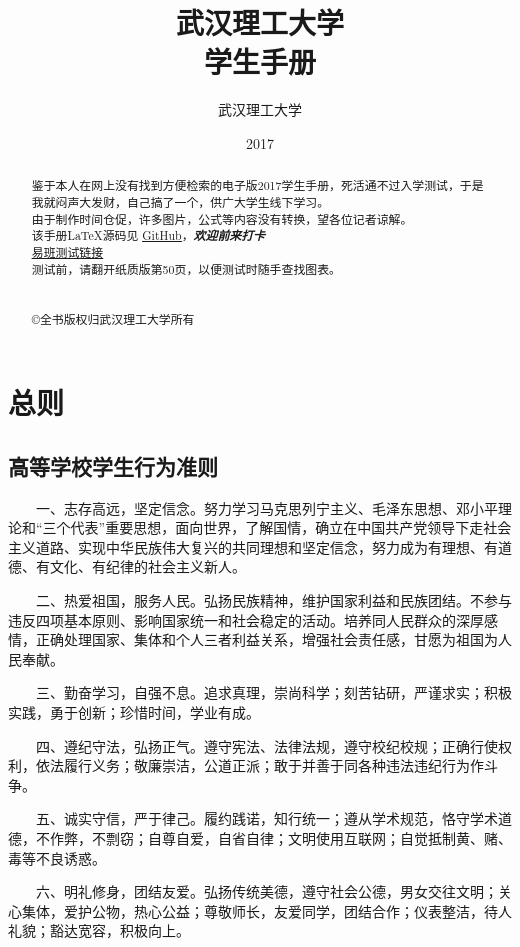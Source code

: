 \documentclass[UTF8,12pt,a4paper]{report}
\title{\textbf{武汉理工大学} \\ \textbf{学生手册}}
\author{武汉理工大学}
\date{2017}
\begin{document}
	
	\maketitle
\begin{abstract}
鉴于本人在网上没有找到方便检索的电子版2017学生手册，死活通不过入学测试，于是我就闷声大发财，自己搞了一个，供广大学生线下学习。\\
由于制作时间仓促，许多图片，公式等内容没有转换，望各位记者谅解。\\
该手册\LaTeX 源码见 \href{https://github.com/Markhng/WHUT-Student-Handbook/}{\underline{GitHub}}，\textbf{\textit{欢迎前来打卡}}\\
\href{http://www.yiban.cn/t/student/showtk/}{\underline{易班测试链接}}\\
测试前，请翻开纸质版第50页，以便测试时随手查找图表。\\\\\\
\copyright 全书版权归武汉理工大学所有
\end{abstract}
	\tableofcontents
\part{总则}
\chapter{高等学校学生行为准则}
　　一、志存高远，坚定信念。努力学习马克思列宁主义、毛泽东思想、邓小平理论和“三个代表”重要思想，面向世界，了解国情，确立在中国共产党领导下走社会主义道路、实现中华民族伟大复兴的共同理想和坚定信念，努力成为有理想、有道德、有文化、有纪律的社会主义新人。

　　二、热爱祖国，服务人民。弘扬民族精神，维护国家利益和民族团结。不参与违反四项基本原则、影响国家统一和社会稳定的活动。培养同人民群众的深厚感情，正确处理国家、集体和个人三者利益关系，增强社会责任感，甘愿为祖国为人民奉献。

　　三、勤奋学习，自强不息。追求真理，崇尚科学；刻苦钻研，严谨求实；积极实践，勇于创新；珍惜时间，学业有成。

　　四、遵纪守法，弘扬正气。遵守宪法、法律法规，遵守校纪校规；正确行使权利，依法履行义务；敬廉崇洁，公道正派；敢于并善于同各种违法违纪行为作斗争。

　　五、诚实守信，严于律己。履约践诺，知行统一；遵从学术规范，恪守学术道德，不作弊，不剽窃；自尊自爱，自省自律；文明使用互联网；自觉抵制黄、赌、毒等不良诱惑。

　　六、明礼修身，团结友爱。弘扬传统美德，遵守社会公德，男女交往文明；关心集体，爱护公物，热心公益；尊敬师长，友爱同学，团结合作；仪表整洁，待人礼貌；豁达宽容，积极向上。
\end{document}
